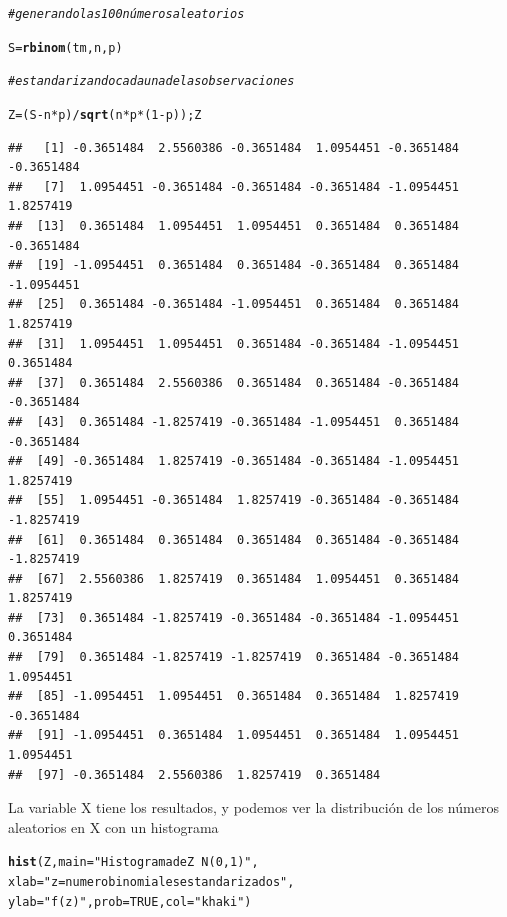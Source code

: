 \documentclass[12pt,letterpaper]{article}\usepackage[]{graphicx}\usepackage[]{color}
\makeatletter
\newcommand{\hlnum}[1]{\textcolor[rgb]{0.686,0.059,0.569}{#1}}%
\newcommand{\hlstr}[1]{\textcolor[rgb]{0.192,0.494,0.8}{#1}}%
\newcommand{\hlcom}[1]{\textcolor[rgb]{0.678,0.584,0.686}{\textit{#1}}}%
\newcommand{\hlopt}[1]{\textcolor[rgb]{0,0,0}{#1}}%
\newcommand{\hlstd}[1]{\textcolor[rgb]{0.345,0.345,0.345}{#1}}%
\newcommand{\hlkwb}[1]{\textcolor[rgb]{0.69,0.353,0.396}{#1}}%
\newcommand{\hlkwc}[1]{\textcolor[rgb]{0.333,0.667,0.333}{#1}}%
\newcommand{\hlkwd}[1]{\textcolor[rgb]{0.737,0.353,0.396}{\textbf{#1}}}%
\newenvironment{kframe}{%
 \def\at@end@of@kframe{}%
 \ifinner\ifhmode%
  \def\at@end@of@kframe{\end{minipage}}%
  \begin{minipage}{\columnwidth}%
 \fi\fi%
 \def\FrameCommand##1{\hskip\@totalleftmargin \hskip-\fboxsep
 \colorbox{shadecolor}{##1}\hskip-\fboxsep
     \hskip-\linewidth \hskip-\@totalleftmargin \hskip\columnwidth}%
 \MakeFramed {\advance\hsize-\width
   \@totalleftmargin\z@ \linewidth\hsize
   \@setminipage}}%
 {\par\unskip\endMakeFramed%
 \at@end@of@kframe}
\newenvironment{knitrout}{}{} %
\makeatother
\begin{document}
\begin{enumerate}
\begin{knitrout}
\begin{kframe}
\begin{alltt}
\hlcom{# generando las 100 números aleatorios}

\hlstd{S} \hlkwb{=} \hlkwd{rbinom}\hlstd{(tm, n, p)}

\hlcom{# estandarizando cada una de las observaciones}

\hlstd{Z} \hlkwb{=} \hlstd{(S}\hlopt{-}\hlstd{n}\hlopt{*}\hlstd{p)}\hlopt{/}\hlkwd{sqrt}\hlstd{(n}\hlopt{*}\hlstd{p}\hlopt{*}\hlstd{(}\hlnum{1}\hlopt{-}\hlstd{p)); Z}
\end{alltt}
\begin{verbatim}
##   [1] -0.3651484  2.5560386 -0.3651484  1.0954451 -0.3651484 -0.3651484
##   [7]  1.0954451 -0.3651484 -0.3651484 -0.3651484 -1.0954451  1.8257419
##  [13]  0.3651484  1.0954451  1.0954451  0.3651484  0.3651484 -0.3651484
##  [19] -1.0954451  0.3651484  0.3651484 -0.3651484  0.3651484 -1.0954451
##  [25]  0.3651484 -0.3651484 -1.0954451  0.3651484  0.3651484  1.8257419
##  [31]  1.0954451  1.0954451  0.3651484 -0.3651484 -1.0954451  0.3651484
##  [37]  0.3651484  2.5560386  0.3651484  0.3651484 -0.3651484 -0.3651484
##  [43]  0.3651484 -1.8257419 -0.3651484 -1.0954451  0.3651484 -0.3651484
##  [49] -0.3651484  1.8257419 -0.3651484 -0.3651484 -1.0954451  1.8257419
##  [55]  1.0954451 -0.3651484  1.8257419 -0.3651484 -0.3651484 -1.8257419
##  [61]  0.3651484  0.3651484  0.3651484  0.3651484 -0.3651484 -1.8257419
##  [67]  2.5560386  1.8257419  0.3651484  1.0954451  0.3651484  1.8257419
##  [73]  0.3651484 -1.8257419 -0.3651484 -0.3651484 -1.0954451  0.3651484
##  [79]  0.3651484 -1.8257419 -1.8257419  0.3651484 -0.3651484  1.0954451
##  [85] -1.0954451  1.0954451  0.3651484  0.3651484  1.8257419 -0.3651484
##  [91] -1.0954451  0.3651484  1.0954451  0.3651484  1.0954451  1.0954451
##  [97] -0.3651484  2.5560386  1.8257419  0.3651484
\end{verbatim}
\end{kframe}
\end{knitrout}

La variable X tiene los resultados, y podemos ver la distribuci\'on de los n\'umeros aleatorios en X con un histograma
\begin{knitrout}
\color{fgcolor}\begin{kframe}
\begin{alltt}
\hlkwd{hist}\hlstd{(Z,} \hlkwc{main}\hlstd{=}\hlstr{"Histograma de Z ~ N(0, 1)"}\hlstd{,}
     \hlkwc{xlab}\hlstd{=}\hlstr{"z = numero binomiales estandarizados"}\hlstd{,}
\hlkwc{ylab}\hlstd{=}\hlstr{"f(z)"}\hlstd{,} \hlkwc{prob}\hlstd{=}\hlnum{TRUE}\hlstd{,} \hlkwc{col}\hlstd{=}\hlstr{"khaki"}\hlstd{)}


\end{alltt}
\end{kframe}
\end{knitrout}
\end{enumerate}
\end{document}
